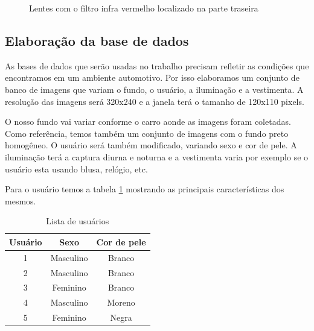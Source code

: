 \begin{figure}[ht!]
	\centering
	\setlength{\fboxsep}{1pt}
  	\caption{Lentes com o filtro infra vermelho localizado na parte traseira}
  	\label{fig:camera_02}
\end{figure}

\subsection{Elaboração da base de dados}

As bases de dados que serão usadas no trabalho precisam refletir as condições que encontramos em um ambiente automotivo. Por isso elaboramos um conjunto de banco de imagens que variam o fundo, o usuário, a iluminação e a vestimenta. A resolução das imagens será 320x240 e a janela terá o tamanho de 120x110 pixels.

O nosso fundo vai variar conforme o carro aonde as imagens foram coletadas. Como referência, temos também um conjunto de imagens com o fundo preto homogêneo.
O usuário será também modificado, variando sexo e cor de pele. A iluminação terá a captura diurna e noturna e a vestimenta varia por exemplo se o usuário esta usando blusa, relógio, etc.

Para o usuário temos a tabela \ref{table:usuarios} mostrando as principais características dos mesmos.

\begin{table}[h]
	\centering
	\begin{tabular}{|c|c|c|}
		\hline Usuário & Sexo & Cor de pele \\
		\hline 1 & Masculino & Branco \\
		\hline 2 & Masculino & Branco \\
		\hline 3 & Feminino & Branco \\
		\hline 4 & Masculino & Moreno \\
		\hline 5 & Feminino & Negra \\
		\hline
	\end{tabular}
	\caption{Lista de usuários}
	\label{table:usuarios}
\end{table}

